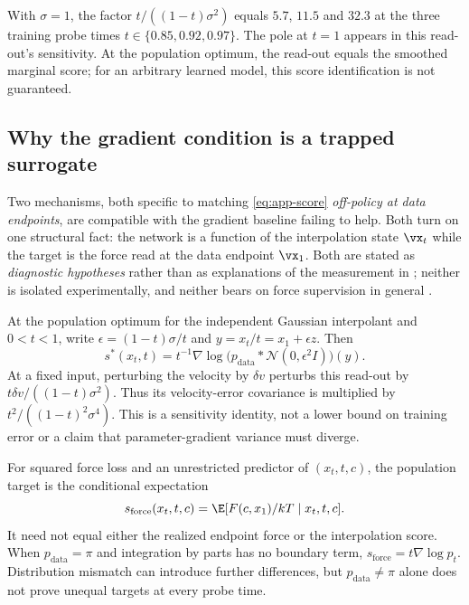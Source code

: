 \begin{remark}
\label{rem:app-amplification}
With $\sigma = 1$, the factor $t/((1-t)\sigma^2)$ equals $5.7$, $11.5$ and $32.3$
at the three training probe times $t \in \{0.85, 0.92, 0.97\}$. The pole at
$t = 1$ appears in this read-out's sensitivity. At the population optimum,
the read-out equals the smoothed marginal score; for an arbitrary learned model,
this score identification is not guaranteed.
\end{remark}

\subsection{Why the gradient condition is a trapped surrogate}
\label{app:trap}

Two mechanisms, both specific to matching \eqref{eq:app-score} \emph{off-policy at
data endpoints}, are compatible with the gradient baseline failing to help. Both
turn on one structural fact: the network is a function of the interpolation state
$\vx_t$ while the target is the force read at the data endpoint $\vx_1$. Both are
stated as \emph{diagnostic hypotheses} rather than as explanations of the
measurement in ; neither is isolated experimentally, and neither
bears on force supervision in general \citep{psm,driftingboltzmann}.

\begin{proposition}
\label{prop:trap}
At the population optimum for the independent Gaussian interpolant and $0<t<1$,
write $\epsilon=(1-t)\sigma/t$ and $y=x_t/t=x_1+\epsilon z$. Then
\[
 s^*(x_t,t)=t^{-1}\nabla\log\bigl(p_{\mathrm{data}}*
                 \mathcal N(0,\epsilon^2I)\bigr)(y).
\]
At a fixed input, perturbing the velocity by $\delta v$ perturbs this read-out
by $t\delta v/((1-t)\sigma^2)$. Thus its velocity-error covariance is multiplied
by $t^2/((1-t)^2\sigma^4)$. This is a sensitivity identity, not a lower bound on
training error or a claim that parameter-gradient variance must diverge.
\end{proposition}

\begin{proposition}
\label{prop:conflict}
For squared force loss and an unrestricted predictor of $(x_t,t,c)$, the
population target is the conditional expectation
\begin{equation}
 s_{\mathrm{force}}(x_t,t,c)
 =\E[F(c,x_1)/kT\mid x_t,t,c].
 \label{eq:app-condexp}
\end{equation}
It need not equal either the realized endpoint force or the interpolation score.
When $p_{\mathrm{data}}=\pi$ and integration by parts has no boundary term,
$s_{\mathrm{force}}=t\nabla\log p_t$. Distribution mismatch can introduce further
differences, but $p_{\mathrm{data}}\ne\pi$ alone does not prove unequal targets
at every probe time.
\end{proposition}


